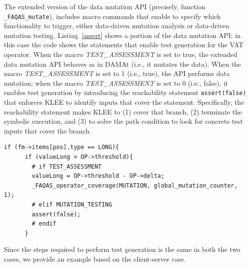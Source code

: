 The extended version of the data mutation API (precisely, function \texttt{\_FAQAS\_mutate}), 
includes macro commands that enable to specify which functionality to trigger, either data-driven mutation analysis or data-driven mutation testing.
Listing~\ref{assert} shows a portion of the data mutation API; in this case the code shows the statements that enable test generation for the VAT operator. When the macro \emph{TEST\_ASSESSMENT} is set to true, the extended data mutation API behaves as in DAMAt (i.e., it mutates the data). When the macro \emph{TEST\_ASSESSMENT} is set to 1 (i.e., true), the API performs data mutation; 
when the macro \emph{TEST\_ASSESSMENT} is set to 0 (i.e., false), 
it enables test generation by introducing the reachability statement \texttt{assert(false)} that enforces KLEE to identify inputs that cover the statement.
Specifically, the reachability statement makes KLEE to (1) cover that branch, (2)  terminate the symbolic execution, and (3) to solve the path condition to look for concrete test inputs that cover the branch.


\begin{lstlisting}[style=CStyle, float=t, caption=\_FAQAS\_mutate excerpt., label=assert]
if (fm->items[pos].type == LONG){
      if (valueLong > OP->threshold){
      	# if TEST_ASSESSMENT
        valueLong = OP->threshold - OP->delta;
        _FAQAS_operator_coverage(MUTATION, global_mutation_counter, 1); 
        # elif MUTATION_TESTING
        assert(false);
        # endif
      }
\end{lstlisting}


Since the steps required to perform test generation is the same in both the two cases, we provide an example based on the client-server case.

